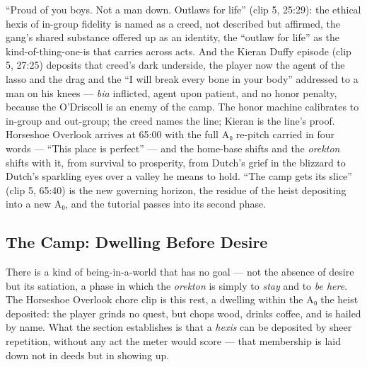 \documentclass{article}
\begin{document}
``Proud of you boys. Not a man down. Outlaws for life'' (clip 5, 25:29): the ethical hexis of in-group fidelity is named as a creed, not described but affirmed, the gang's shared substance offered up as an identity, the ``outlaw for life'' as the kind-of-thing-one-is that carries across acts. And the Kieran Duffy episode (clip 5, 27:25) deposits that creed's dark underside, the player now the agent of the lasso and the drag and the ``I will break every bone in your body'' addressed to a man on his knees — \textit{bia} inflicted, agent upon patient, and no honor penalty, because the O'Driscoll is an enemy of the camp. The honor machine calibrates to in-group and out-group; the creed names the line; Kieran is the line's proof. Horseshoe Overlook arrives at 65:00 with the full A₀ re-pitch carried in four words — ``This place is perfect'' — and the home-base shifts and the \textit{orekton} shifts with it, from survival to prosperity, from Dutch's grief in the blizzard to Dutch's sparkling eyes over a valley he means to hold. ``The camp gets its slice'' (clip 5, 65:40) is the new governing horizon, the residue of the heist depositing into a new A₀, and the tutorial passes into its second phase.

\bigskip

\subsection*{The Camp: Dwelling Before Desire}

There is a kind of being-in-a-world that has no goal — not the absence of desire but its satiation, a phase in which the \textit{orekton} is simply to \textit{stay} and to \textit{be here}. The Horseshoe Overlook chore clip is this rest, a dwelling within the A₀ the heist deposited: the player grinds no quest, but chops wood, drinks coffee, and is hailed by name. What the section establishes is that a \textit{hexis} can be deposited by sheer repetition, without any act the meter would score — that membership is laid down not in deeds but in showing up.
\end{document}

